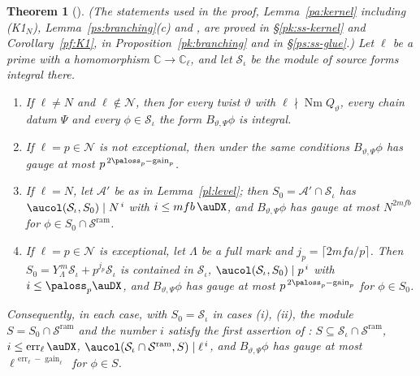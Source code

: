 \documentclass[10pt]{amsart}
\newtheorem{theorem}{Theorem}[section]
\theoremstyle{definition}
\theoremstyle{remark}
\newcommand{\C}{\mathbb C}
\providecommand{\auNm}{\operatorname{Nm}}
\providecommand{\auS}{\mathcal S}
\providecommand{\auSram}{\mathcal S^{\mathrm{ram}}}
\providecommand{\auerr}{\operatorname{err}}
\providecommand{\augain}{\operatorname{gain}}
\begin{document}
\begin{theorem}[{\cite[Proposition~14.20]{P46}}]\label{pa:divis}
(The statements used in the proof, Lemma~\ref{pa:kernel} including (K1$_N$),
Lemma~\ref{ps:branching}(c) and {\cite[Proposition~14.25]{P46}}, are proved in \S\ref{pk:ss-kernel}
and Corollary~\ref{pf:K1}, in Proposition~\ref{pk:branching} and in \S\ref{ps:ss-glue}.) Let $\ell$ be a prime with a
homomorphism $\C\to\C_\ell$, and let $\auS_\iota$ be the module of source forms integral there.
\begin{enumerate}
\item[(i)] If $\ell\ne N$ and $\ell\notin\mathcal N$, then for every twist $\vartheta$ with
$\ell\nmid\auNm Q_\vartheta$, every chain datum $\Psi$ and every $\phi\in\auS_\iota$ the form
$B_{\vartheta,\Psi}\phi$ is integral.
\item[(ii)] If $\ell=p\in\mathcal N$ is not exceptional, then under the same conditions
$B_{\vartheta,\Psi}\phi$ has gauge at most $p^{\,2\paloss_p-\augain_p}$.
\item[(iii)] If $\ell=N$, let $\mathcal A'$ be as in Lemma~\ref{pl:level}; then $S_0=\mathcal A'\cap\auS_\iota$ has
$\aucol(\auS_\iota,S_0)\mid N^{\,i}$ with $i\le mfb\,\auDX$, and $B_{\vartheta,\Psi}\phi$ has gauge
at most $N^{2mfb}$ for $\phi\in S_0\cap\auSram$.
\item[(iv)] If $\ell=p\in\mathcal N$ is exceptional, let $\Lambda$ be a full mark and $j_p=\lceil2mfa/p\rceil$. Then
$S_0=Y_\Lambda^{\,m}\auS_\iota+p^{j_p}\auS_\iota$ is contained in $\auS_\iota$,
$\aucol(\auS_\iota,S_0)\mid p^{\,i}$ with $i\le\paloss_p\auDX$, and $B_{\vartheta,\Psi}\phi$ has
gauge at most $p^{\,2\paloss_p-\augain_p}$ for $\phi\in S_0$.
\end{enumerate}
Consequently, in each case, with $S_0=\auS_\iota$ in cases (i), (ii), the module
$S=S_0\cap\auSram$ and the number $i$ satisfy the first assertion of
{\cite[Proposition~14.20]{P46}}: $S\subseteq\auS_\iota\cap\auSram$, $i\le\auerr_\ell\auDX$,
$\aucol(\auS_\iota\cap\auSram,S)\mid\ell^{\,i}$, and $B_{\vartheta,\Psi}\phi$ has gauge at most
$\ell^{\,\auerr_\ell-\augain_\ell}$ for $\phi\in S$.
\end{theorem}
\end{document}
